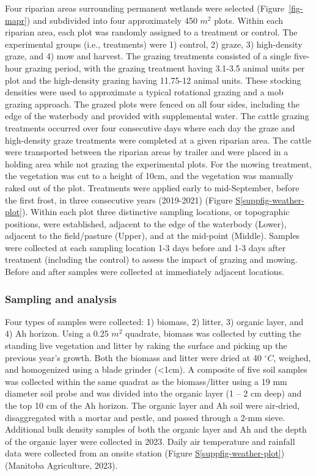 \documentclass[
]{agujournal2019}
\newcommand*\quartosuppfigref[1]{Figure \hyperref[#1]{S\ref{#1}}}
\begin{document}
Four riparian areas surrounding permanent wetlands were selected
(Figure~\ref{fig-mapr}) and subdivided into four approximately 450
\(m^2\) plots. Within each riparian area, each plot was randomly
assigned to a treatment or control. The experimental groups (i.e.,
treatments) were 1) control, 2) graze, 3) high-density graze, and 4) mow
and harvest. The grazing treatments consisted of a single five-hour
grazing period, with the grazing treatment having 3.1-3.5 animal units
per plot and the high-density grazing having 11.75-12 animal units.
These stocking densities were used to approximate a typical rotational
grazing and a mob grazing approach. The grazed plots were fenced on all
four sides, including the edge of the waterbody and provided with
supplemental water. The cattle grazing treatments occurred over four
consecutive days where each day the graze and high-density graze
treatments were completed at a given riparian area. The cattle were
transported between the riparian areas by trailer and were placed in a
holding area while not grazing the experimental plots. For the mowing
treatment, the vegetation was cut to a height of 10cm, and the
vegetation was manually raked out of the plot. Treatments were applied
early to mid-September, before the first frost, in three consecutive
years (2019-2021) (\quartosuppfigref{suppfig-weather-plot}). Within each
plot three distinctive sampling locations, or topographic positions,
were established, adjacent to the edge of the waterbody (Lower),
adjacent to the field/pasture (Upper), and at the mid-point (Middle).
Samples were collected at each sampling location 1-3 days before and 1-3
days after treatment (including the control) to assess the impact of
grazing and mowing. Before and after samples were collected at
immediately adjacent locations.

\subsubsection{Sampling and analysis}\label{sampling-and-analysis}

Four types of samples were collected: 1) biomass, 2) litter, 3) organic
layer, and 4) Ah horizon. Using a 0.25 \(m^2\) quadrate, biomass was
collected by cutting the standing live vegetation and litter by raking
the surface and picking up the previous year's growth. Both the biomass
and litter were dried at 40 \(^\circ C\), weighed, and homogenized using
a blade grinder (\textless1cm). A composite of five soil samples was
collected within the same quadrat as the biomass/litter using a 19 mm
diameter soil probe and was divided into the organic layer (1 -- 2 cm
deep) and the top 10 cm of the Ah horizon. The organic layer and Ah soil
were air-dried, disaggregated with a mortar and pestle, and passed
through a 2-mm sieve. Additional bulk density samples of both the
organic layer and Ah and the depth of the organic layer were collected
in 2023. Daily air temperature and rainfall data were collected from an
onsite station (\quartosuppfigref{suppfig-weather-plot}) (Manitoba
Agriculture, 2023).
\end{document}
